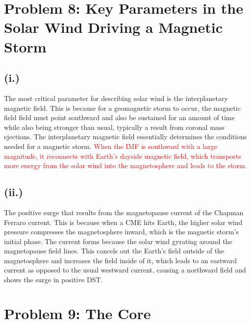 \documentclass[11pt]{article}
\begin{document}
\newpage
\section*{Problem 8: Key Parameters in the Solar Wind Driving a Magnetic Storm}
\subsection*{(i.)}
\hspace*{2em}The most critical parameter for describing solar wind is the interplanetary magnetic field. This is because for a geomagnetic storm to occur, the magnetic field field must point southward and also be sustained for an amount of time while also being stronger than usual, typically a result from coronal mass ejections. The interplanetary magnetic field essentially determines the conditions needed for a magnetic storm. \textcolor{red}{When the IMF is southward
with a large magnitude, it reconnects with Earth's dayside magnetic field, which transports more energy from the solar wind into the
magnetosphere and leads to the storm.}
\subsection*{(ii.)}
\hspace*{2em}The positive surge that results from the magnetopause current of the Chapman Ferraro current. This is because when a CME hits Earth, the higher solar wind pressure compresses the magnetosphere inward, which is the magnetic storm's initial phase. The current forms because the solar wind gyrating around the magnetopause field lines. This cancels out the Earth's field outside of the magnetosphere and increases the field inside of it, which leads to an eastward current as opposed to the usual westward current, causing a northward field and shows the surge in positive DST. 

\newpage
\section*{Problem 9: The Core}
\end{document}
